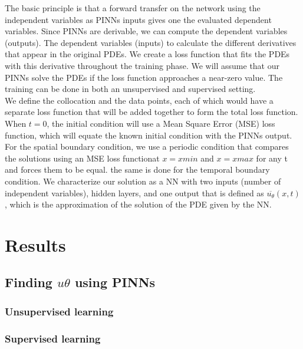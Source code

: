 \documentclass{article}
\begin{document}
The basic principle is that a forward transfer on the network using the independent variables as PINNs inputs gives one the evaluated dependent variables.
Since PINNs are derivable, we can compute the dependent variables (outputs). The dependent variables (inputs) to calculate the different derivatives that appear in the original PDEs. We create a loss function that fits the PDEs with this derivative throughout the training phase. 
We will assume that our PINNs solve the PDEs if the loss function approaches a near-zero value. The training can be done in both an unsupervised and supervised setting.\\

We define the collocation and the data points, each of which would have a separate loss function that will be added together to form the total loss function.
When $t = 0$, the initial condition will use a Mean Square Error (MSE) loss function, which will equate the known initial condition with the PINNs output. For the spatial boundary condition, 
we use a periodic condition that compares the solutions using an MSE loss functionat $x=xmin$ and $x=xmax$ for any t and forces them to be equal. the same is done for the temporal boundary condition. 
We characterize our solution as a NN with two inputs (number of independent variables), hidden layers, and one output that is defined as $\overline{u_\theta}(x,t)$, which is the approximation of the solution of the PDE given by the NN. 



\section{Results}

\subsection{Finding $u\theta$ using PINNs}


\subsubsection{Unsupervised learning}


\subsubsection{Supervised learning}
\end{document}
